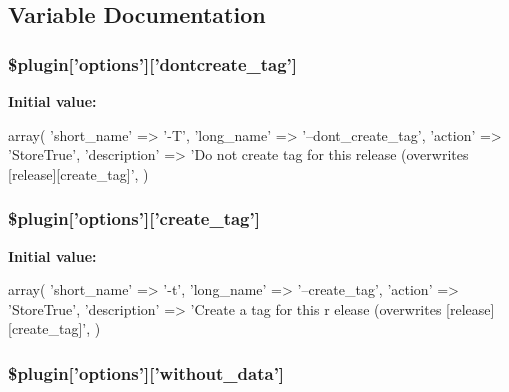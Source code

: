 \subsection{Variable Documentation}
\hypertarget{plugin__release-create_8class_8php_a951d7222122569b065f209a13c12250e}{
\subsubsection[{\$plugin}]{\setlength{\rightskip}{0pt plus 5cm}\$plugin\mbox{[}'options'\mbox{]}\mbox{[}'dontcreate\_\-tag'\mbox{]}}}
\label{plugin__release-create_8class_8php_a951d7222122569b065f209a13c12250e}
{\bfseries Initial value:}
\begin{DoxyCode}
 array(
                                          'short_name'  => '-T',
                                          'long_name'   => '--dont_create_tag',
                                          'action'      => 'StoreTrue',
                                          'description' => 'Do not create tag for
       this release (overwrites [release][create_tag]',
                                        )
\end{DoxyCode}
\hypertarget{plugin__release-create_8class_8php_a6e7b88802e5be7b3bc005da47aebb510}{
\subsubsection[{\$plugin}]{\setlength{\rightskip}{0pt plus 5cm}\$plugin\mbox{[}'options'\mbox{]}\mbox{[}'create\_\-tag'\mbox{]}}}
\label{plugin__release-create_8class_8php_a6e7b88802e5be7b3bc005da47aebb510}
{\bfseries Initial value:}
\begin{DoxyCode}
 array(
                                        'short_name'  => '-t',
                                        'long_name'   => '--create_tag',
                                        'action'      => 'StoreTrue',
                                        'description' => 'Create a tag for this r
      elease (overwrites [release][create_tag]',
                                      )
\end{DoxyCode}
\hypertarget{plugin__release-create_8class_8php_a9238d4fa0d55f1851db6015dacb611a7}{
\subsubsection[{\$plugin}]{\setlength{\rightskip}{0pt plus 5cm}\$plugin\mbox{[}'options'\mbox{]}\mbox{[}'without\_\-data'\mbox{]}}}
